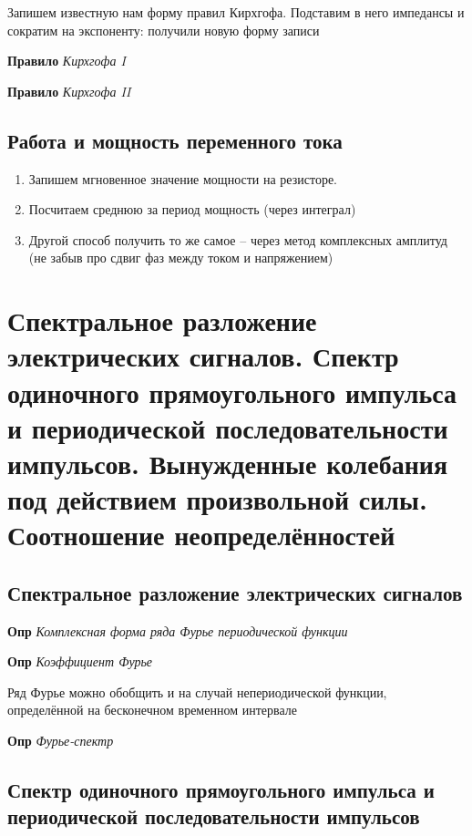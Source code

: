 \documentclass[a4paper, 14pt]{article}
\begin{document}
    Запишем известную нам форму правил Кирхгофа.
    Подставим в него импедансы и сократим на экспоненту: получили новую форму записи
    
    \textbf{Правило} \textit{Кирхгофа I}
    
    \textbf{Правило} \textit{Кирхгофа II}
    
    \subsection{Работа и мощность переменного тока}
    
    \begin{enumerate}
        \item Запишем мгновенное значение мощности на резисторе.
        \item Посчитаем среднюю за период мощность (через интеграл)
        \item Другой способ получить то же самое -- через метод комплексных амплитуд (не забыв про сдвиг фаз между
        током и напряжением)
    \end{enumerate}
    
    \section{Спектральное разложение электрических сигналов.
    Спектр одиночного прямоугольного импульса и периодической последовательности импульсов.
    Вынужденные колебания под действием произвольной силы.
    Соотношение неопределённостей}
    
    \subsection{Спектральное разложение электрических сигналов}
    
    \textbf{Опр} \textit{Комплексная форма ряда Фурье периодической функции}
    
    \textbf{Опр} \textit{Коэффициент Фурье}
    
    Ряд Фурье можно обобщить и на случай непериодической функции, определённой на бесконечном временном интервале
    
    \textbf{Опр} \textit{Фурье-спектр}
    
    \subsection{Спектр одиночного прямоугольного импульса и периодической последовательности импульсов}
    
\end{document}

